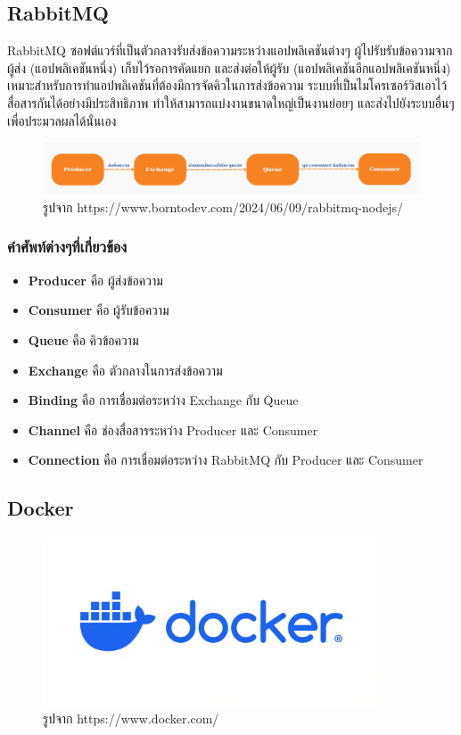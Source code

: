 \subsection{RabbitMQ}
\hspace{1.27cm}RabbitMQ \cite{rabbitmq}ซอฟต์แวร์ที่เป็นตัวกลางรับส่งข้อความระหว่างแอปพลิเคชันต่างๆ ผู้ไปรับรับข้อความจากผู้ส่ง (แอปพลิเคชันหนึ่ง) เก็บไว้รอการคัดแยก และส่งต่อให้ผู้รับ (แอปพลิเคชันอีกแอปพลิเคชันหนึ่ง) เหมาะสำหรับการทำแอปพลิเคชันที่ต้องมีการจัดคิวในการส่งข้อความ ระบบที่เป็นไมโครเซอร์วิสเอาไว้สื่อสารกันได้อย่างมีประสิทธิภาพ ทำให้สามารถแบ่งงานขนาดใหญ่เป็นงานย่อยๆ และส่งไปยังระบบอื่นๆ เพื่อประมวลผลได้นั่นเอง
\begin{figure}[H] %
    \centering
    \includegraphics[width=\linewidth, keepaspectratio]{pictures/rabbitmq.png}
    \caption[RabbitMQ]{รูปจาก https://www.borntodev.com/2024/06/09/rabbitmq-nodejs/}
    \label{fig:rabbitmq}
\end{figure}
  \subsubsection{คำศัพท์ต่างๆที่เกี่ยวข้อง}
  \begin{itemize}
    \item \textbf{Producer} คือ ผู้ส่งข้อความ
    \item \textbf{Consumer} คือ ผู้รับข้อความ
    \item \textbf{Queue} คือ คิวข้อความ
    \item \textbf{Exchange} คือ ตัวกลางในการส่งข้อความ
    \item \textbf{Binding} คือ การเชื่อมต่อระหว่าง Exchange กับ Queue
    \item \textbf{Channel} คือ ช่องสื่อสารระหว่าง Producer และ Consumer
    \item \textbf{Connection} คือ การเชื่อมต่อระหว่าง RabbitMQ กับ Producer และ Consumer
  \end{itemize}
\subsection{Docker}
\begin{figure}[H]
  \centering
  \includegraphics[width=100mm, keepaspectratio ]{pictures/docker.png}
  \caption[Docker]{รูปจาก https://www.docker.com/}
  \label{fig:docker}
\end{figure}

